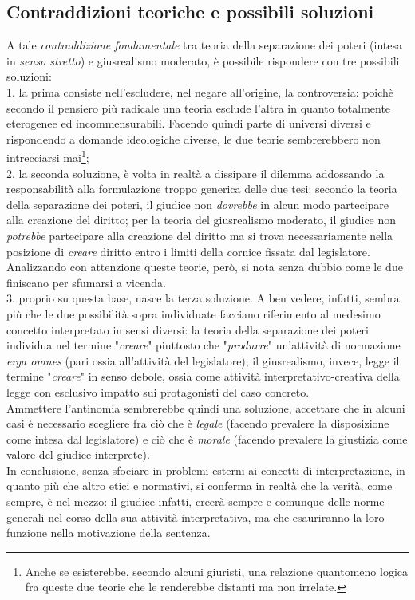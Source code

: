\subsection{Contraddizioni teoriche e possibili soluzioni}
A tale \textit{contraddizione fondamentale} tra teoria della separazione dei poteri (intesa in \textit{senso stretto}) e giusrealismo moderato, è possibile rispondere con tre possibili soluzioni:
\\1. la prima consiste nell'escludere, nel negare all'origine, la controversia: poichè secondo il pensiero più radicale una teoria esclude l'altra in quanto totalmente eterogenee ed incommensurabili. Facendo quindi parte di universi diversi e rispondendo a domande ideologiche diverse, le due teorie sembrerebbero non intrecciarsi mai\footnote{Anche se esisterebbe, secondo alcuni giuristi, una relazione quantomeno logica fra queste due teorie che le renderebbe distanti ma non irrelate.};
\\2. la seconda soluzione, è volta in realtà a dissipare il dilemma addossando la responsabilità alla formulazione troppo generica delle due tesi: secondo la teoria della separazione dei poteri, il giudice non \textit{dovrebbe} in alcun modo partecipare alla creazione del diritto; per la teoria del giusrealismo moderato, il giudice non \textit{potrebbe} partecipare alla creazione del diritto ma si trova necessariamente nella posizione di \textit{creare} diritto entro i limiti della cornice fissata dal legislatore. Analizzando con attenzione queste teorie, però, si nota senza dubbio come le due finiscano per sfumarsi a vicenda.
\\3. proprio su questa base, nasce la terza soluzione. A ben vedere, infatti, sembra più che le due possibilità sopra individuate facciano riferimento al medesimo concetto interpretato in sensi diversi: la teoria della separazione dei poteri individua nel termine "\textit{creare}" piuttosto che "\textit{produrre}" un'attività di normazione \textit{erga omnes} (pari ossia all'attività del legislatore); il giusrealismo, invece, legge il termine "\textit{creare}" in senso debole, ossia come attività interpretativo-creativa della legge con esclusivo impatto sui protagonisti del caso concreto.
\\Ammettere l'antinomia sembrerebbe quindi una soluzione, accettare che in alcuni casi è necessario scegliere fra ciò che è \textit{legale} (facendo prevalere la disposizione come intesa dal legislatore) e ciò che è \textit{morale} (facendo prevalere la giustizia come valore del giudice-interprete).
\\In conclusione, senza sfociare in problemi esterni ai concetti di interpretazione, in quanto più che altro etici e normativi, si conferma in realtà che la verità, come sempre, è nel mezzo: il giudice infatti, creerà sempre e comunque delle norme generali nel corso della sua attività interpretativa, ma che esauriranno la loro funzione nella motivazione della sentenza.
